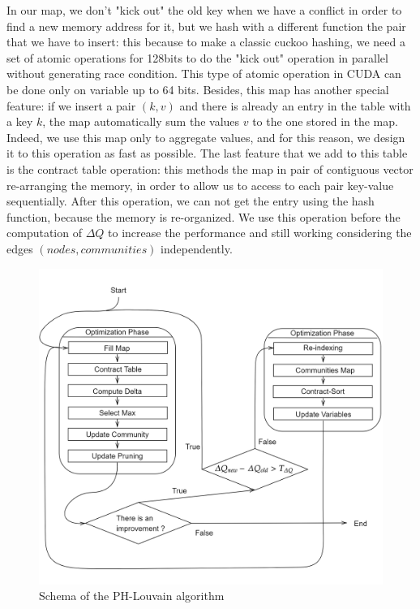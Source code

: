 In our map, we don't "kick out" the old key when we have a conflict in order to find a new memory address for it, but we hash with a different function the pair that we have to insert: this because to make a classic cuckoo hashing, we need a set of atomic operations for 128bits to do the "kick out" operation in parallel without generating race condition. This type of atomic operation in CUDA can be done only on variable up to 64 bits. Besides, this map has another special feature: if we insert a pair $(k,v)$ and there is already an entry in the table with a key $k$, the map automatically sum the values $v$ to the one stored in the map. Indeed, we use this map only to aggregate values, and for this reason, we design it to this operation as fast as possible. The last feature that we add to this table is the contract table operation: this methods the map in pair of contiguous vector re-arranging the memory, in order to allow us to access to each pair key-value sequentially. After this operation, we can not get the entry using the hash function, because the memory is re-organized. We use this operation before the computation of $\Delta Q$ to increase the performance and still working considering the edges $(nodes, communities)$ independently. 
\begin{figure}[t!]
	\centering
	\includegraphics[width=1\linewidth]{0-resources/PH-Louvain}
	\caption{Schema of the PH-Louvain algorithm}
	\label{fig:ph-louvain}
\end{figure}
